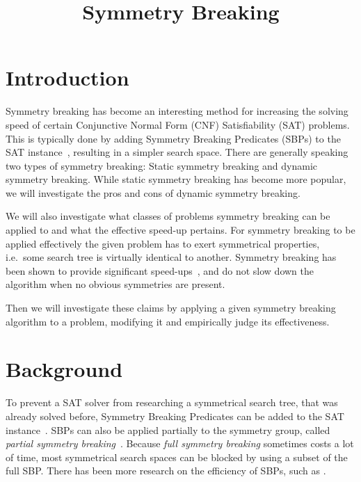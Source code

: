 

\title{Symmetry Breaking}


	\maketitle

	\listoftodos

	\begin{abstract}
	\end{abstract}

	\section{Introduction}
	\label{sec:Introduction}

		Symmetry breaking has become an interesting method for increasing the solving speed of
		certain Conjunctive Normal Form (CNF) Satisfiability (SAT) problems.
		This is typically done by adding Symmetry Breaking Predicates (SBPs) to the SAT
		instance~\cite{sakallah2009symmetry}, resulting in a simpler search space.
		There are generally speaking two types of symmetry breaking: Static symmetry breaking and
		dynamic symmetry breaking.
		While static symmetry breaking has become more popular,
		we will investigate the pros and cons of dynamic symmetry breaking.

		We will also investigate what classes of problems symmetry breaking can be applied to and
		what the effective speed-up pertains.
		For symmetry breaking to be applied effectively the given problem has to exert symmetrical
		properties, i.e.\ some search tree is virtually identical to another.
		Symmetry breaking has been shown to provide significant
		speed-ups~\cite{darga2004exploiting,aloul2003solving}, and do not slow down the algorithm
		when no obvious symmetries are present.

		Then we will investigate these claims by applying a given symmetry breaking algorithm to a
		problem, modifying it and empirically judge its effectiveness. 

	\section{Background} \label{sec:Background}
		To prevent a SAT solver from researching a symmetrical search tree, that was already solved
		before, Symmetry Breaking Predicates can be added to the SAT
		instance~\cite{sakallah2009symmetry}. SBPs can also be applied partially to the symmetry
		group, called \textit{partial symmetry breaking}~\cite{sakallah2009symmetry}. Because
		\textit{full symmetry breaking} sometimes costs a lot of time, most symmetrical search
		spaces can be blocked by using a subset of the full SBP. There has been more research on
		the efficiency of SBPs, such as \cite{aloul2006efficient}.

